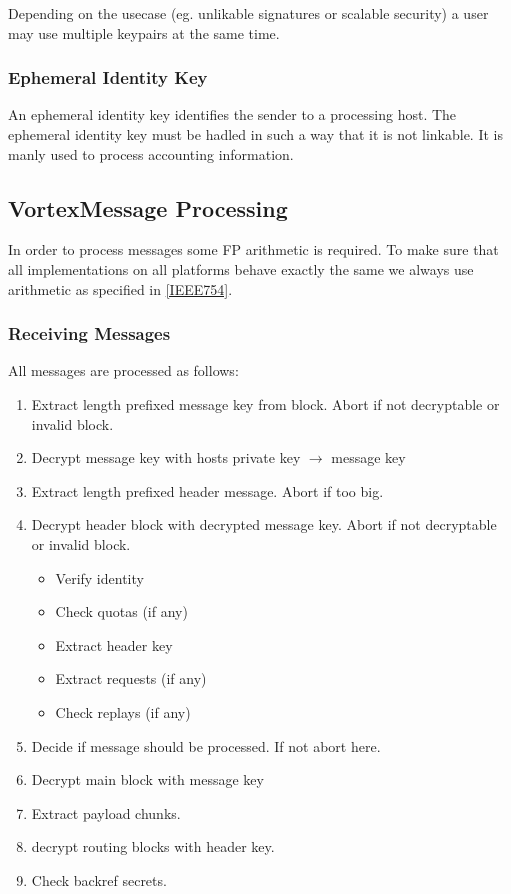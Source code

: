 Depending on the usecase (eg. unlikable signatures or scalable security) a user may use multiple keypairs at the same time.

\subsubsection{Ephemeral Identity Key}
An ephemeral identity key identifies the sender to a processing host. The ephemeral identity key must be hadled in such a way that it is not linkable. It is manly used to process accounting information.

\subsection{VortexMessage Processing}
In order to process messages some FP arithmetic is required. To make sure that all implementations on all platforms behave exactly the same we always use arithmetic as specified in \ref{IEEE754}.

\subsubsection{Receiving Messages}
All messages are processed as follows:
\begin{enumerate}
	\item Extract length prefixed message key from block. Abort if not decryptable or invalid block.
	\item Decrypt message key with hosts private key $\rightarrow$ message key
	\item Extract length prefixed header message. Abort if too big.
	\item Decrypt header block with decrypted message key. Abort if not decryptable or invalid block.
	\begin{itemize}
		\item Verify identity
		\item Check quotas (if any)
		\item Extract header key
		\item Extract requests (if any)
		\item Check replays (if any)
	\end{itemize}
	\item Decide if message should be processed. If not abort here.
	\item Decrypt main block with message key
	\item Extract payload chunks.
	\item decrypt routing blocks with header key.
	\item Check backref secrets.
\end{enumerate}

